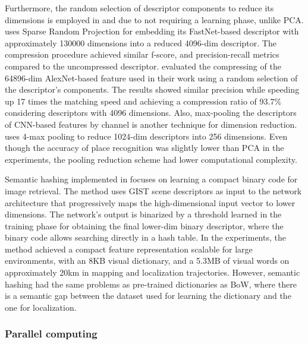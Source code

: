 Furthermore, the random selection of descriptor components to reduce its dimensions is employed in \cite{naseer-et-al:2017:7989305} and \cite{xin-et-al:2017:8310121} due to not requiring a learning phase, unlike PCA.
\cite{naseer-et-al:2017:7989305} uses Sparse Random Projection for embedding its FastNet-based descriptor with approximately 130000 dimensions into a reduced 4096-dim descriptor. The compression procedure achieved similar f-score, and precision-recall metrics compared to the uncompressed descriptor.
\cite{xin-et-al:2017:8310121} evaluated the compressing of the 64896-dim AlexNet-based feature used in their work using a random selection of the descriptor's components. The results showed similar precision while speeding up 17 times the matching speed and achieving a compression ratio of 93.7\% considering descriptors with 4096 dimensions.
Also, max-pooling the descriptors of CNN-based features by channel is another technique for dimension reduction.
\cite{yu-et-al:2019:8961714} uses 4-max pooling to reduce 1024-dim descriptors into 256 dimensions. Even though the accuracy of place recognition was slightly lower than PCA in the experiments, the pooling reduction scheme had lower computational complexity.

Semantic hashing implemented in \cite{ikeda-tanaka:2010:5509579} focuses on learning a compact binary code for image retrieval. The method uses GIST scene descriptors as input to the network architecture that progressively maps the high-dimensional input vector to lower dimensions. The network's output is binarized by a threshold learned in the training phase for obtaining the final lower-dim binary descriptor, where the binary code allows searching directly in a hash table. In the experiments, the method achieved a compact feature representation scalable for large environments, with an 8KB visual dictionary, and a 5.3MB of visual words on approximately 20km in mapping and localization trajectories. However, semantic hashing had the same problems as pre-trained dictionaries as BoW, where there is a semantic gap between the dataset used for learning the dictionary and the one for localization.



\subsubsection{Parallel computing}

